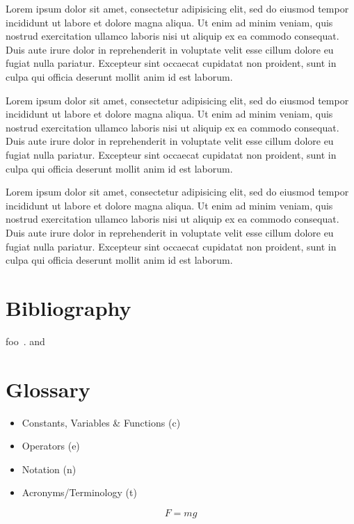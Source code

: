 \documentclass[10pt,a4paper,extrafontsizes,oldfontcommands,oneside]{memoir}
\begin{document}
Lorem ipsum dolor sit amet, consectetur adipisicing elit, sed do eiusmod tempor incididunt ut labore et dolore magna aliqua. Ut enim ad minim veniam, quis nostrud exercitation ullamco laboris nisi ut aliquip ex ea commodo consequat. Duis aute irure dolor in reprehenderit in voluptate velit esse cillum dolore eu fugiat nulla pariatur. Excepteur sint occaecat cupidatat non proident, sunt in culpa qui officia deserunt mollit anim id est laborum.

Lorem ipsum dolor sit amet, consectetur adipisicing elit, sed do eiusmod tempor incididunt ut labore et dolore magna aliqua. Ut enim ad minim veniam, quis nostrud exercitation ullamco laboris nisi ut aliquip ex ea commodo consequat. Duis aute irure dolor in reprehenderit in voluptate velit esse cillum dolore eu fugiat nulla pariatur. Excepteur sint occaecat cupidatat non proident, sunt in culpa qui officia deserunt mollit anim id est laborum.

Lorem ipsum dolor sit amet, consectetur adipisicing elit, sed do eiusmod tempor incididunt ut labore et dolore magna aliqua. Ut enim ad minim veniam, quis nostrud exercitation ullamco laboris nisi ut aliquip ex ea commodo consequat. Duis aute irure dolor in reprehenderit in voluptate velit esse cillum dolore eu fugiat nulla pariatur. Excepteur sint occaecat cupidatat non proident, sunt in culpa qui officia deserunt mollit anim id est laborum.


\section{Bibliography} %
\label{sec:bibliography}

foo~\citeauthor{companion}. and \cite{companion}


\section{Glossary} %
\label{sec:glossary}

\begin{itemize}
	\item Constants, Variables \& Functions (c)
	\item Operators (e)
	\item Notation (n)
	\item Acronyms/Terminology (t)
\end{itemize}

\begin{equation}
	F=mg
\end{equation}
\end{document}
